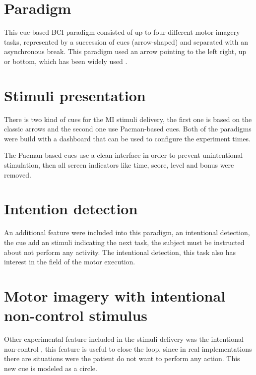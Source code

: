 \section{Paradigm}
This cue-based \gls*{BCI} paradigm consisted of up to four different motor imagery tasks, represented by a succession of cues (arrow-shaped) and separated with an asynchronous break. This paradigm used an arrow pointing to the left right, up or bottom, which has been widely used \cite{choi2013electroencephalography, llanos2013mu}.



\section{Stimuli presentation}
There is two kind of cues for the \gls{MI} stimuli delivery, the first one is based on the classic arrows and the second one use Pacman-based cues. Both of the paradigms were build with a dashboard that can be used to configure the experiment times.


The Pacman-based cues use a clean interface in order to prevent unintentional stimulation, then all screen indicators like time, score, level and bonus were removed. 



\section{Intention detection}
An additional feature were included into this paradigm, an intentional detection, the cue add an stimuli indicating the next task, the subject must be instructed about not perform any activity. The intentional detection, this task also has interest in the field of the motor execution.



\section{Motor imagery with intentional non-control stimulus}
Other experimental feature included in the stimuli delivery was the intentional non-control \cite{perdikis2014subject}, this feature is useful to close the loop, since in real implementations there are situations were the patient do not want to perform any action. This new cue is modeled as a circle. 


